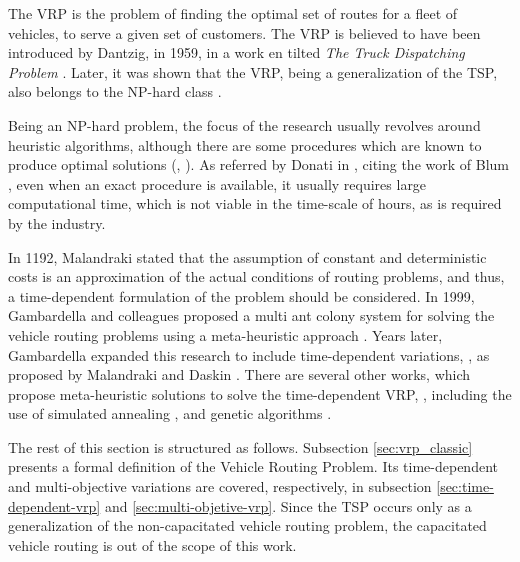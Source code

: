 The \ac{VRP} is the problem of finding the optimal set of routes for a fleet of vehicles, to serve a given set of customers. The VRP is believed to have been introduced by Dantzig, in 1959, in a work en tilted \textit{The Truck Dispatching Problem} \cite{truck_problem_dantzig}. Later, it was shown that the VRP, being a generalization of the TSP, also belongs to the NP-hard class \cite{VRP_complexity}. 

Being an NP-hard problem, the focus of the research usually revolves around heuristic algorithms, although there are some procedures which are known to produce optimal solutions (\cite{VRP_exact_heuristic}, \cite{TDVRP_exact}). As referred by Donati in \cite{MACS_VRPTW}, citing the work of Blum \cite{blum_complexity},
even when an exact procedure is available, it usually requires large computational time, which is not viable in the time-scale of hours, as is required by the industry. 

In 1192, Malandraki \cite{TDVRP_92} stated that the assumption of constant and deterministic costs is an approximation of the actual conditions of routing problems, and thus, a time-dependent formulation of the problem should be considered. In 1999, Gambardella and colleagues proposed a multi ant colony system for solving the vehicle routing problems using a meta-heuristic approach \cite{MACS_VRPTW}. Years later, Gambardella expanded this research to include time-dependent variations, \cite{TDVRP_multi_objective_aco}, as proposed by Malandraki and Daskin \cite{TDVRP_92}. There are several other works, which propose meta-heuristic solutions to solve the time-dependent VRP, \cite{VRP_meta}, including the use of simulated annealing \cite{tdvrp_costs}, and genetic algorithms \cite{TDVRP_GA}. 

The rest of this section is structured as follows. Subsection \ref{sec:vrp_classic} presents a formal definition of the Vehicle Routing Problem. Its time-dependent and multi-objective variations are covered, respectively, in subsection \ref{sec:time-dependent-vrp} and \ref{sec:multi-objetive-vrp}. Since the TSP occurs only as a generalization of the non-capacitated vehicle routing problem,
the capacitated vehicle routing is out of the scope of this work.
